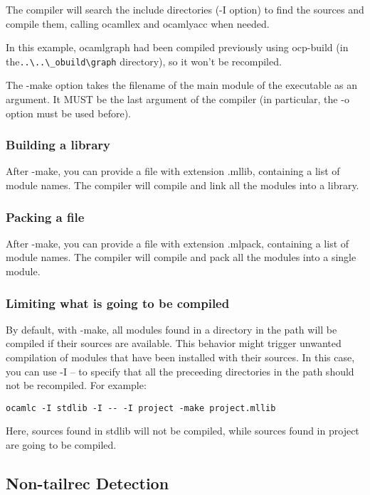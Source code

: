The compiler will search the include directories (-I option) to find the sources and compile them, calling ocamllex and ocamlyacc when needed.

In this example, ocamlgraph had been compiled previously using ocp-build (in the\lstinline[style=Bash]{..\..\_obuild\graph} directory), so it won't be recompiled.

The -make option takes the filename of the main module of the executable as an argument. It MUST be the last argument of the compiler (in particular, the -o option must be used before).

\subsubsection{Building a library}

After -make, you can provide a file with extension .mllib, containing a list of module names. The compiler will compile and link all the modules into a library.

\subsubsection{Packing a file}

After -make, you can provide a file with extension .mlpack, containing a list of module names. The compiler will compile and pack all the modules into a single module.

\subsubsection{Limiting what is going to be compiled}

By default, with -make, all modules found in a directory in the path will be compiled if their sources are available. This behavior might trigger unwanted compilation of modules that have been installed with their sources. In this case, you can use -I -- to specify that all the preceeding directories in the path should not be recompiled. For example:

\begin{lstlisting}[style=Bash]
ocamlc -I stdlib -I -- -I project -make project.mllib
\end{lstlisting}

Here, sources found in stdlib will not be compiled, while sources found in project are going to be compiled.

\subsection{Non-tailrec Detection}

